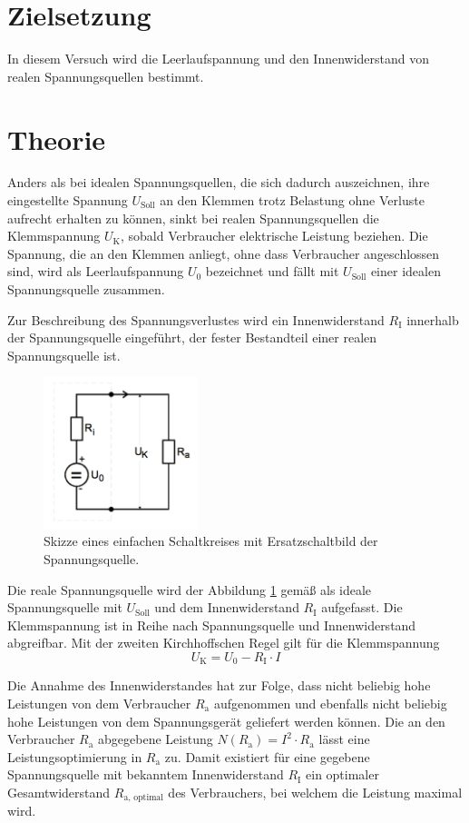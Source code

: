 \section{Zielsetzung}
In diesem Versuch wird die Leerlaufspannung und den Innenwiderstand von realen Spannungsquellen bestimmt.

\section{Theorie}
\label{sec:Theorie}
Anders als bei idealen Spannungsquellen, die sich dadurch auszeichnen, ihre eingestellte Spannung $U_\text{Soll}$ an den Klemmen trotz Belastung ohne Verluste aufrecht erhalten zu können, 
sinkt bei realen Spannungsquellen die Klemmspannung $U_\text{K}$, sobald Verbraucher elektrische Leistung beziehen.
Die Spannung, die an den Klemmen anliegt, ohne dass Verbraucher angeschlossen sind, 
wird als Leerlaufspannung $U_0$ bezeichnet und fällt mit $U_\text{Soll}$ einer idealen Spannungsquelle zusammen.

Zur Beschreibung des Spannungsverlustes wird ein Innenwiderstand $R_\text{I}$ innerhalb der Spannungsquelle eingeführt, der fester Bestandteil einer realen Spannungsquelle ist.
\begin{figure}[ht]
	\centering
  	\includegraphics[width=0.4\textwidth]{Bilder/Innenwiderstand}
	\caption{Skizze eines einfachen Schaltkreises mit Ersatzschaltbild der Spannungsquelle.}
	\label{fig:Innenleben}
\end{figure}
Die reale Spannungsquelle wird der Abbildung \ref{fig:Innenleben} gemäß als ideale Spannungsquelle mit $U_\text{Soll}$ und dem Innenwiderstand $R_\text{I}$ aufgefasst. 
Die Klemmspannung ist in Reihe nach Spannungsquelle und Innenwiderstand abgreifbar.
Mit der zweiten Kirchhoffschen Regel gilt für die Klemmspannung
\begin{equation}
	U_\text{K} = U_\text{0} - R_\text{I}\cdot I
	\label{eq:Klemmspannung}
\end{equation}

Die Annahme des Innenwiderstandes hat zur Folge, dass nicht beliebig hohe Leistungen von dem Verbraucher $R_\text{a}$ aufgenommen und ebenfalls nicht beliebig hohe Leistungen von dem Spannungsgerät geliefert werden können. 
Die an den Verbraucher $R_\text{a}$ abgegebene Leistung $N(R_\text{a}) = I^2\cdot R_\text{a}$ lässt eine Leistungsoptimierung in $R_\text{a}$ zu. 
Damit existiert für eine gegebene Spannungsquelle mit bekanntem Innenwiderstand $R_\text{I}$ ein optimaler Gesamtwiderstand $R_\text{a, optimal}$ des Verbrauchers,
bei welchem die Leistung maximal wird.